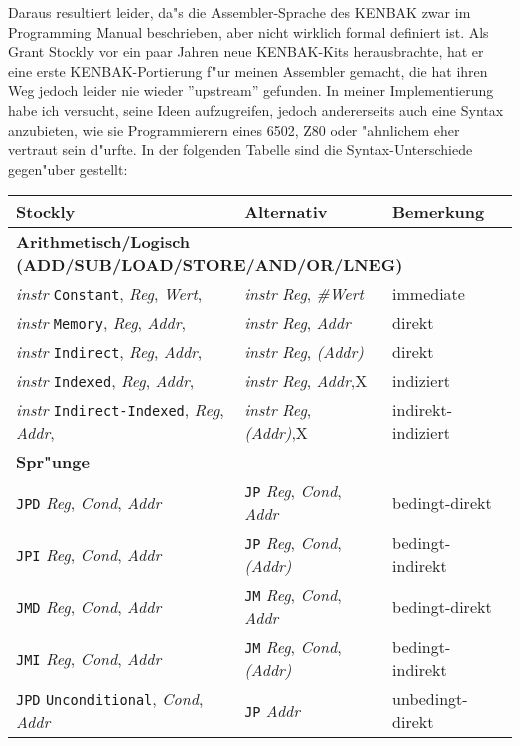 \documentclass[12pt,a4paper,twoside]{report}
\begin{document}
Daraus resultiert leider, da"s die Assembler-Sprache des KENBAK zwar im
Programming Manual beschrieben, aber nicht wirklich formal definiert ist.  Als
Grant Stockly vor ein paar Jahren neue KENBAK-Kits herausbrachte, hat er 
eine erste KENBAK-Portierung f"ur meinen Assembler gemacht, die hat ihren
Weg jedoch leider nie wieder ''upstream'' gefunden.  In meiner Implementierung
habe ich versucht, seine Ideen aufzugreifen, jedoch andererseits auch eine
Syntax anzubieten, wie sie Programmierern eines 6502, Z80 oder "ahnlichem
eher vertraut sein d"urfte.  In der folgenden Tabelle sind die Syntax-Unterschiede
gegen"uber gestellt:

\hfuzz=5pt
\begin{center}\begin{longtable}{|l|l|l|}
\hline
Stockly & Alternativ & Bemerkung \\
\hline
\hline
\endhead
\multicolumn{3}{|l|}{\bf Arithmetisch/Logisch (ADD/SUB/LOAD/STORE/AND/OR/LNEG)} \\
\hline
{\it instr} {\tt Constant}, {\it Reg}, {\it Wert}, & {\it instr} {\it Reg}, {\it \#Wert} & immediate \\
{\it instr} {\tt Memory}, {\it Reg}, {\it Addr}, & {\it instr} {\it Reg}, {\it Addr} & direkt \\
{\it instr} {\tt Indirect}, {\it Reg}, {\it Addr}, & {\it instr} {\it Reg}, {\it (Addr)} & direkt \\
{\it instr} {\tt Indexed}, {\it Reg}, {\it Addr}, & {\it instr} {\it Reg}, {\it Addr},X & indiziert \\
{\it instr} {\tt Indirect-Indexed}, {\it Reg}, {\it Addr}, & {\it instr} {\it Reg}, {\it (Addr)},X & indirekt-indiziert \\
\hline
\multicolumn{3}{|l|}{\bf Spr"unge} \\
\hline
{\tt JPD} {\it Reg}, {\it Cond}, {\it Addr} & {\tt JP} {\it Reg}, {\it Cond}, {\it Addr} & bedingt-direkt \\
{\tt JPI} {\it Reg}, {\it Cond}, {\it Addr} & {\tt JP} {\it Reg}, {\it Cond}, {\it (Addr)} & bedingt-indirekt \\
{\tt JMD} {\it Reg}, {\it Cond}, {\it Addr} & {\tt JM} {\it Reg}, {\it Cond}, {\it Addr} & bedingt-direkt \\
{\tt JMI} {\it Reg}, {\it Cond}, {\it Addr} & {\tt JM} {\it Reg}, {\it Cond}, {\it (Addr)} & bedingt-indirekt \\
{\tt JPD} {\tt Unconditional}, {\it Cond}, {\it Addr} & {\tt JP} {\it Addr} & unbedingt-direkt \\

\end{longtable}
\end{center}
\end{document}
